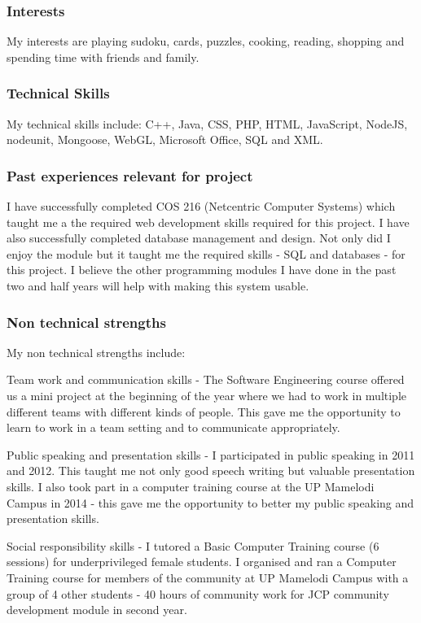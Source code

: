 \documentclass[hidelinks, 12pt, oneside]{article}
\begin{document}
\subsubsection{Interests}

My interests are playing sudoku, cards, puzzles, cooking, reading, shopping and spending time with friends and family.

\subsubsection{Technical Skills}

My technical skills include: C++, Java, CSS, PHP, HTML, JavaScript, NodeJS, nodeunit, Mongoose, WebGL, Microsoft Office, SQL and XML.
 
\subsubsection{Past experiences relevant for project}

I have successfully completed COS 216 (Netcentric Computer Systems)  which taught me a the required web development skills required for this project. 
I have also successfully completed database management and design. Not only did I enjoy the module but it taught me the required skills - SQL and databases - for this project. 
I believe the other programming modules I have done in the past two and half years will help with making this system usable.

\subsubsection{Non technical strengths}

My non technical strengths include: 

Team work and communication skills - The Software Engineering course offered us a mini project at the beginning of the year where we had to work in multiple different teams with different kinds of people. This gave me the opportunity to learn to work in a team setting and to communicate appropriately.
 
Public speaking and presentation skills - I participated in public speaking in 2011 and 2012. This taught me not only good speech writing but valuable presentation skills.
I also took part in a computer training course at the UP Mamelodi Campus in 2014 - this gave me the opportunity to better my public speaking and presentation skills.

Social responsibility skills - I tutored a Basic Computer Training course (6 sessions) for underprivileged female students.
I organised and ran a Computer Training course for members of the community at UP Mamelodi Campus with a group of 4 other students - 40 hours of community work for JCP community development module in second year.
\end{document}
